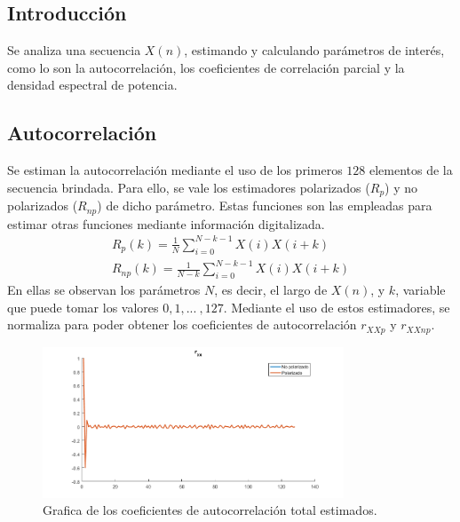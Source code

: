 %
%
%

\subsection{Introducción}

Se analiza una secuencia $X(n)$, estimando y calculando parámetros de interés, como lo son la autocorrelación, los coeficientes de correlación parcial y la densidad espectral de potencia.

\subsection{Autocorrelación} 

Se estiman la autocorrelación mediante el uso de los primeros $128$ elementos de la secuencia brindada. Para ello, se vale los estimadores polarizados ($R_{p}$) y no polarizados ($R_{np}$) de dicho parámetro. Estas funciones son las empleadas para estimar otras funciones mediante información digitalizada.
\begin{equation}
\begin{gathered}
	R_{p}(k) = \frac{1}{N} \sum_{i=0}^{N-k-1} X(i)X(i+k)	\\
	R_{np}(k) = \frac{1}{N-k} \sum_{i=0}^{N-k-1} X(i)X(i+k)
\end{gathered}
\end{equation}
En ellas se observan los parámetros $N$, es decir, el largo de $X(n)$, y $k$, variable que puede tomar los valores $0, 1, ... \ , 127$. Mediante el uso de estos estimadores, se normaliza para poder obtener los coeficientes de autocorrelación $r_{XXp}$ y $r_{XXnp}$. 

\begin{figure}[H]
\centering
	\includegraphics[width=0.8\textwidth, trim = {0 0 0 0.7cm},clip]{./ImagenesEjercicio2/rxx.png}
	\caption{Grafica de los coeficientes de autocorrelación total estimados.}
	\label{fig:rxx}
\end{figure}

